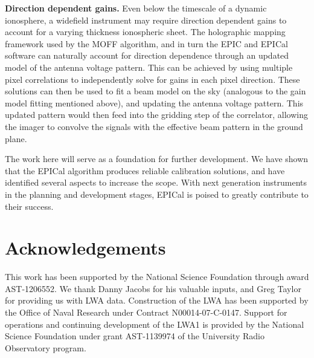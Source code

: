 \documentclass[a4paper,fleqn,usenatbib]{../mnras}
\begin{document}
\textbf{Direction dependent gains.} Even below the timescale of a dynamic ionosphere, a widefield instrument may require direction dependent gains to account for a varying thickness ionospheric sheet. The holographic mapping framework used by the MOFF algorithm, and in turn the EPIC and EPICal software can naturally account for direction dependence through an updated model of the antenna voltage pattern. This can be achieved by using multiple pixel correlations to independently solve for gains in each pixel direction. These solutions can then be used to fit a beam model on the sky (analogous to the gain model fitting mentioned above), and updating the antenna voltage pattern. This updated pattern would then feed into the gridding step of the correlator, allowing the imager to convolve the signals with the effective beam pattern in the ground plane. 

The work here will serve as a foundation for further development. We have shown that the EPICal algorithm produces reliable calibration solutions, and have identified several aspects to increase the scope. With next generation instruments in the planning and development stages, EPICal is poised to greatly contribute to their success.

\section*{Acknowledgements}
This work has been supported by the National Science Foundation through award AST-1206552. 
We thank Danny Jacobs for his valuable inputs, and Greg Taylor for providing us with LWA data. 
Construction of the LWA has been supported by the Office of Naval Research under 
Contract N00014-07-C-0147. Support for operations and continuing development of 
the LWA1 is provided by the National Science Foundation under grant AST-1139974 
of the University Radio Observatory program.















\bsp	%
\label{lastpage}
\end{document}
